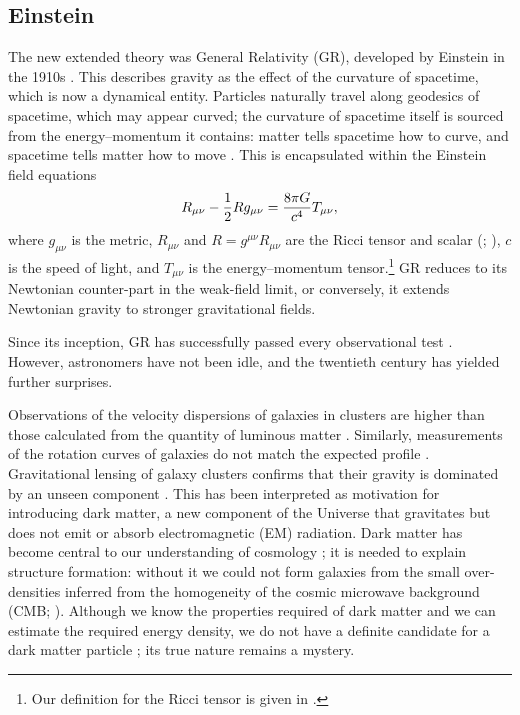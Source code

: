 \subsection{Einstein}

The new extended theory was General Relativity (GR), developed by Einstein in the 1910s \citep{Einstein1997}. This describes gravity as the effect of the curvature of spacetime, which is now a dynamical entity. Particles naturally travel along geodesics of spacetime, which may appear curved; the curvature of spacetime itself is sourced from the energy--momentum it contains: matter tells spacetime how to curve, and spacetime tells matter how to move \citep[section 1.1]{Misner1973}. This is encapsulated within the Einstein field equations \citep[documents 22, 25]{Einstein1997}
\begin{equation}
R_{\mu\nu} - \dfrac{1}{2}R g_{\mu\nu} = \dfrac{8\pi G}{c^4}T_{\mu\nu},
\end{equation}
where $g_{\mu\nu}$ is the metric, $R_{\mu\nu}$ and $R = g^{\mu\nu}R_{\mu\nu}$ are the Ricci tensor and scalar (\citealt[section 8.7]{Misner1973}; \citealt[section 3.2]{Wald1984}), $c$ is the speed of light, and $T_{\mu\nu}$ is the energy--momentum tensor.\footnote{Our definition for the Ricci tensor is given in .} GR reduces to its Newtonian counter-part in the weak-field limit, or conversely, it extends Newtonian gravity to stronger gravitational fields.

Since its inception, GR has successfully passed every observational test \citep{Will1993, Will2006}. However, astronomers have not been idle, and the twentieth century has yielded further surprises.

Observations of the velocity dispersions of galaxies in clusters are higher than those calculated from the quantity of luminous matter \citep[e.g.,][]{Zwicky1937}. Similarly, measurements of the rotation curves of galaxies do not match the expected profile \citep{Babcock1939}. Gravitational lensing of galaxy clusters confirms that their gravity is dominated by an unseen component \citep{Bergmann1990,Clowe2006}. This has been interpreted as motivation for introducing dark matter, a new component of the Universe that gravitates but does not emit or absorb electromagnetic (EM) radiation. Dark matter has become central to our understanding of cosmology \citep[e.g.,][]{Springel2006a}; it is needed to explain structure formation: without it we could not form galaxies from the small over-densities inferred from the homogeneity of the cosmic microwave background (CMB; \citealt{White1978,Liddle1993}). Although we know the properties required of dark matter and we can estimate the required energy density, we do not have a definite candidate for a dark matter particle \citep{Bertone2005}; its true nature remains a mystery.

